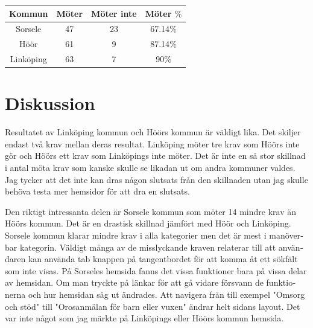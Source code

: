 \documentclass[11p]{article}
\begin{document}
\begin{otherlanguage}{swedish}
\begin{center}
    \begin{tabular}{ |c|c|c|c|}
        \hline
        Kommun & Möter & Möter inte & Möter $\%$ \\  \hline
        Sorsele & 47 & 23 & 67.14$\%$ \\ \hline
        Höör & 61 & 9 & 87.14$\%$ \\ \hline
        Linköping & 63 & 7 & 90$\%$ \\ \hline
    \end{tabular}
    \end{center}

    \section{Diskussion}
    Resultatet av Linköping kommun och Höörs kommun är väldigt lika.
    Det skiljer endast två krav mellan deras resultat.
    Linköping möter tre krav som Höörs inte gör och Höörs ett krav som Linköpings inte möter.
    Det är inte en så stor skillnad i antal möta krav som kanske skulle se likadan ut om andra kommuner valdes.
    Jag tycker att det inte kan dras någon slutsats från den skillnaden utan jag skulle behöva testa mer hemsidor för att dra en slutsats.

    Den riktigt intressanta delen är Sorsele kommun som möter 14 mindre krav än Höörs kommun.
    Det är en drastisk skillnad jämfört med Höör och Linköping.
    Sorsele kommun klarar mindre krav i alla kategorier men det är mest i manöverbar kategorin.
    Väldigt många av de misslyckande kraven relaterar till att användaren kan använda tab knappen på tangentbordet för att komma åt ett sökfält som inte visas.
    På Sorseles hemsida fanns det vissa funktioner bara på vissa delar av hemsidan.
    Om man tryckte på länkar för att gå vidare försvann de funktionerna och hur hemsidan såg ut ändrades.
    Att navigera från till exempel "Omsorg och stöd" till "Orosanmälan för barn eller vuxen" ändrar helt sidans layout.
    Det var inte något som jag märkte på Linköpings eller Höörs kommun hemsida.



\end{otherlanguage}
\end{document}
